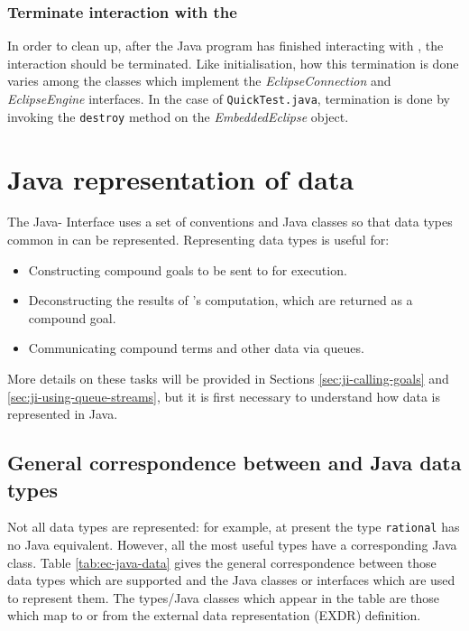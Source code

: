 \subsubsection*{Terminate interaction with the {\eclipse}}
In order to clean up, after the Java program has finished interacting
with {\eclipse}, the interaction should be terminated. Like
initialisation, how this termination is done varies among the classes
which implement the {\it EclipseConnection} and {\it EclipseEngine}
interfaces.  In the case of {\tt QuickTest.java}, termination is done
by invoking the {\tt destroy} method on the {\it EmbeddedEclipse}
object.

\section{Java representation of {\eclipse} data}
\label{sec:ji-terms-in-java}
The Java-{\eclipse} Interface uses a set of conventions and Java classes so that data
types common in {\eclipse} can be represented. Representing {\eclipse} data types is useful for:
\begin{itemize}
\item Constructing compound goals to be sent to {\eclipse} for execution.
\item Deconstructing the results of {\eclipse}'s computation, which are returned as a compound goal.
\item Communicating compound terms and other data via queues. 
\end{itemize}
More details on these tasks will be provided in Sections
\ref{sec:ji-calling-goals} and \ref{sec:ji-using-queue-streams}, but it is first necessary to understand how {\eclipse} data is represented in Java.

\subsection{General correspondence between {\eclipse} and Java data types}
\label{sec:ji-type-correspondence}
Not all {\eclipse} data types are represented: for example, at present
the {\eclipse} type {\tt rational} has no Java equivalent. However, all
the most useful {\eclipse} types have a corresponding Java class.  Table
\ref{tab:ec-java-data} gives the general correspondence between those
{\eclipse} data types which are supported and the Java classes or
interfaces which are used to represent them. The {\eclipse} types/Java
classes which appear in the table are those which map to or from 
the {\eclipse} external data representation (EXDR) definition.

